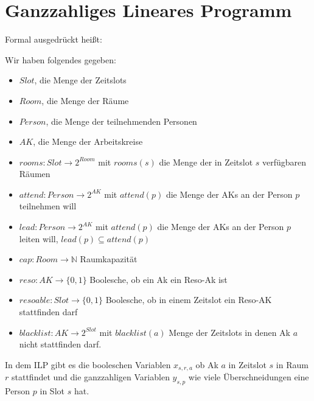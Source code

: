 \documentclass[A4]{article}
\begin{document}
\section{Ganzzahliges Lineares Programm}
Formal ausgedrückt heißt:

Wir haben folgendes gegeben:
\begin{itemize}
		\item $Slot$, die Menge der Zeitslots
		\item $Room$, die Menge der Räume
		\item $Person$, die Menge der teilnehmenden Personen
		\item $AK$, die Menge der Arbeitskreise
		\item $rooms: Slot \rightarrow 2^{Room} $
					mit $rooms(s)$ die Menge der in Zeitslot $s$ verfügbaren Räumen
		\item $attend: Person \rightarrow 2^{AK} $
					mit $attend(p)$ die Menge der AKs an der Person $p$  teilnehmen will
		\item $lead: Person \rightarrow 2^{AK} $
					mit $attend(p)$ die Menge der AKs an der Person $p$ leiten will, $lead(p) \subseteq attend(p)$
		\item $cap: Room \rightarrow \mathbb{N} $ Raumkapazität
		\item $reso: AK \rightarrow \{0,1\}$ Boolesche, ob ein Ak ein Reso-Ak ist
		\item $resoable: Slot \rightarrow \{0,1\}$ Boolesche, ob in einem Zeitslot ein Reso-AK stattfinden darf
		\item $blacklist: AK \rightarrow 2^{Slot}$ mit $blacklist(a)$ Menge der Zeitslots in denen Ak $a$ nicht stattfinden darf.
\end{itemize}

In dem ILP gibt es die booleschen Variablen $x_{s,r,a}$ ob Ak $a$ in Zeitslot $s$ in Raum $r$ stattfindet
und die ganzzahligen Variablen $y_{s,p}$ wie viele Überschneidungen eine Person $p$ in Slot $s$ hat.
\end{document}
